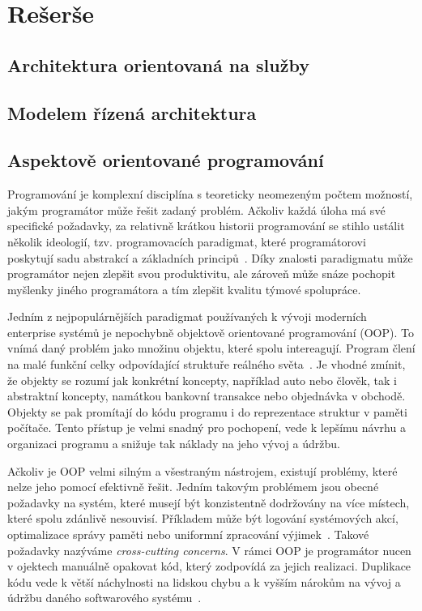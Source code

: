 \usepackage[T1]{fontenc}
\usepackage[utf8]{inputenc}


\chapter{Rešerše}\label{ch:reserse}

\section{Architektura orientovaná na služby}

\section{Modelem řízená architektura}

\section{Aspektově orientované programování}

Programování je komplexní disciplína s teoreticky
neomezeným počtem možností, jakým programátor může
řešit zadaný problém. Ačkoliv každá úloha má své specifické
požadavky, za relativně krátkou historii programování se
stihlo ustálit několik ideologií, tzv. programovacích
paradigmat, které programátorovi poskytují sadu abstrakcí
a základních principů~\cite{van2009programming}.
Díky znalosti paradigmatu může programátor nejen zlepšit
svou produktivitu, ale zároveň může snáze pochopit myšlenky
jiného programátora a tím zlepšit kvalitu týmové spolupráce.

Jedním z nejpopulárnějších paradigmat používaných k
vývoji moderních enterprise systémů je nepochybně
objektově orientované programování (OOP). To vnímá daný problém
jako množinu objektu, které spolu intereagují. Program
člení na malé funkční celky odpovídající struktuře
reálného světa~\cite{rentsch1982object}. Je vhodné zmínit,
že objekty se rozumí jak konkrétní koncepty, například
auto nebo člověk, tak i abstraktní koncepty,
namátkou bankovní transakce nebo objednávka v obchodě.
Objekty se pak promítají do kódu programu i do
reprezentace struktur v paměti počítače.
Tento přístup je velmi snadný pro pochopení,
vede k lepšímu návrhu a organizaci programu a snižuje
tak náklady na jeho vývoj a údržbu.

Ačkoliv je OOP velmi silným a všestraným nástrojem,
existují problémy, které nelze jeho pomocí efektivně řešit.
Jedním takovým problémem jsou obecné požadavky na systém,
které musejí být konzistentně dodržovány na více místech,
které spolu zdánlivě nesouvisí. Příkladem
může být logování systémových akcí, optimalizace správy paměti
nebo uniformní zpracování výjimek~\cite{kiczales1997aspect}.
Takové požadavky nazýváme \textit{cross-cutting concerns}.
V rámci OOP je programátor nucen v ojektech manuálně opakovat
kód, který zodpovídá za jejich realizaci. Duplikace kódu
vede k větší náchylnosti na lidskou chybu a k vyšším nárokům na vývoj
a údržbu daného softwarového systému~\cite{fowler1999refactoring}.

